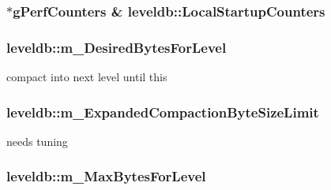 \subsubsection[{Local\+Startup\+Counters}]{ $\ast${\bf g\+Perf\+Counters} \& leveldb\+::\+Local\+Startup\+Counters\hspace{0.3cm}{\ttfamily [static]}}\label{namespaceleveldb_a2ce1588463776c9e070e7aeb2dc16dea}
\hypertarget{namespaceleveldb_aca00621293e009e8cf12635c6f6529a0}{}
\subsubsection[{m\+\_\+\+Desired\+Bytes\+For\+Level}]{ leveldb\+::m\+\_\+\+Desired\+Bytes\+For\+Level}\label{namespaceleveldb_aca00621293e009e8cf12635c6f6529a0}


compact into next level until this 

\hypertarget{namespaceleveldb_a1b6fb99eed946ea4c627c53c92422372}{}
\subsubsection[{m\+\_\+\+Expanded\+Compaction\+Byte\+Size\+Limit}]{ leveldb\+::m\+\_\+\+Expanded\+Compaction\+Byte\+Size\+Limit}\label{namespaceleveldb_a1b6fb99eed946ea4c627c53c92422372}


needs tuning 

\hypertarget{namespaceleveldb_ac943033c07b0c2c7dbc7489454809f28}{}
\subsubsection[{m\+\_\+\+Max\+Bytes\+For\+Level}]{ leveldb\+::m\+\_\+\+Max\+Bytes\+For\+Level}\label{namespaceleveldb_ac943033c07b0c2c7dbc7489454809f28}


